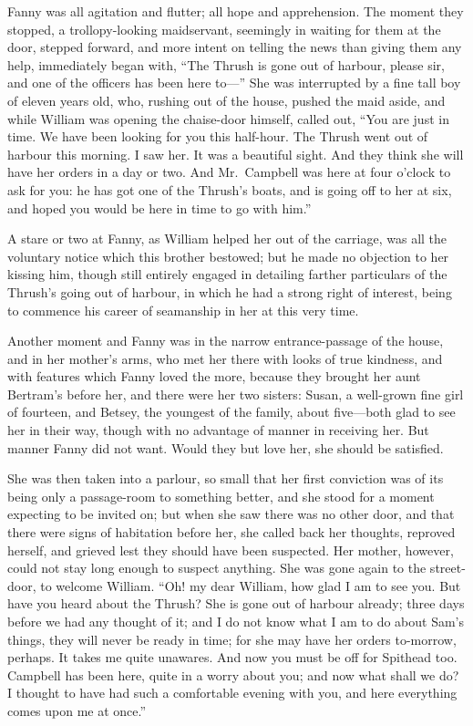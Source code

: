 Fanny was all agitation and flutter; all hope and apprehension.
The moment they stopped, a trollopy-looking maidservant,
seemingly in waiting for them at the door, stepped forward,
and more intent on telling the news than giving them any help,
immediately began with, ``The Thrush is gone out of harbour,
please sir, and one of the officers has been here to---''
She was interrupted by a fine tall boy of eleven years old,
who, rushing out of the house, pushed the maid aside,
and while William was opening the chaise-door himself,
called out, ``You are just in time.  We have been looking
for you this half-hour. The Thrush went out of harbour
this morning.  I saw her.  It was a beautiful sight.
And they think she will have her orders in a day or two.
And Mr.\ Campbell was here at four o'clock to ask for you:
he has got one of the Thrush's boats, and is going off
to her at six, and hoped you would be here in time to go
with him.''

A stare or two at Fanny, as William helped her out of
the carriage, was all the voluntary notice which this
brother bestowed; but he made no objection to her
kissing him, though still entirely engaged in detailing
farther particulars of the Thrush's going out of harbour,
in which he had a strong right of interest, being to
commence his career of seamanship in her at this very time.

Another moment and Fanny was in the narrow entrance-passage
of the house, and in her mother's arms, who met her
there with looks of true kindness, and with features
which Fanny loved the more, because they brought her aunt
Bertram's before her, and there were her two sisters:
Susan, a well-grown fine girl of fourteen, and Betsey,
the youngest of the family, about five---both glad to see
her in their way, though with no advantage of manner
in receiving her.  But manner Fanny did not want.
Would they but love her, she should be satisfied.

She was then taken into a parlour, so small that her
first conviction was of its being only a passage-room
to something better, and she stood for a moment expecting
to be invited on; but when she saw there was no other door,
and that there were signs of habitation before her,
she called back her thoughts, reproved herself, and grieved
lest they should have been suspected.  Her mother,
however, could not stay long enough to suspect anything.
She was gone again to the street-door, to welcome William.
``Oh! my dear William, how glad I am to see you.
But have you heard about the Thrush?  She is gone out of
harbour already; three days before we had any thought of it;
and I do not know what I am to do about Sam's things,
they will never be ready in time; for she may have her orders
to-morrow, perhaps.  It takes me quite unawares.  And now
you must be off for Spithead too.  Campbell has been here,
quite in a worry about you; and now what shall we do?
I thought to have had such a comfortable evening with you,
and here everything comes upon me at once.''

